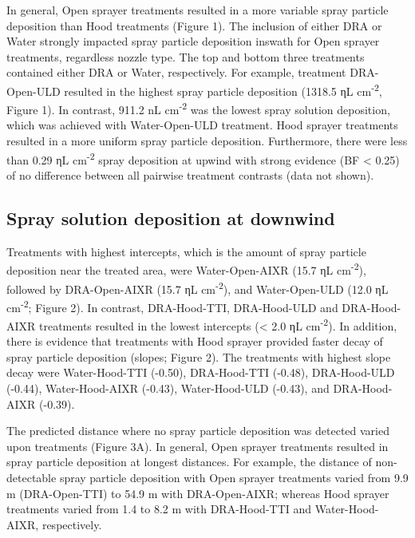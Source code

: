 \documentclass[
  12pt,
  a4paper,
]{article}
\begin{document}
In general, Open sprayer treatments resulted in a more variable spray
particle deposition than Hood treatments (Figure 1). The inclusion of
either DRA or Water strongly impacted spray particle deposition inswath
for Open sprayer treatments, regardless nozzle type. The top and bottom
three treatments contained either DRA or Water, respectively. For
example, treatment DRA-Open-ULD resulted in the highest spray particle
deposition (1318.5 ηL cm\textsuperscript{-2}, Figure 1). In contrast,
911.2 nL cm\textsuperscript{-2} was the lowest spray solution
deposition, which was achieved with Water-Open-ULD treatment. Hood
sprayer treatments resulted in a more uniform spray particle deposition.
Furthermore, there were less than 0.29 ηL cm\textsuperscript{-2} spray
deposition at upwind with strong evidence (BF \textless{} 0.25) of no
difference between all pairwise treatment contrasts (data not shown).

\hypertarget{spray-solution-deposition-at-downwind-1}{%
\subsection{Spray solution deposition at
downwind}\label{spray-solution-deposition-at-downwind-1}}

Treatments with highest intercepts, which is the amount of spray
particle deposition near the treated area, were Water-Open-AIXR (15.7 ηL
cm\textsuperscript{-2}), followed by DRA-Open-AIXR (15.7 ηL
cm\textsuperscript{-2}), and Water-Open-ULD (12.0 ηL
cm\textsuperscript{-2}; Figure 2). In contrast, DRA-Hood-TTI,
DRA-Hood-ULD and DRA-Hood-AIXR treatments resulted in the lowest
intercepts (\textless{} 2.0 ηL cm\textsuperscript{-2}). In addition,
there is evidence that treatments with Hood sprayer provided faster
decay of spray particle deposition (slopes; Figure 2). The treatments
with highest slope decay were Water-Hood-TTI (-0.50), DRA-Hood-TTI
(-0.48), DRA-Hood-ULD (-0.44), Water-Hood-AIXR (-0.43), Water-Hood-ULD
(-0.43), and DRA-Hood-AIXR (-0.39).

The predicted distance where no spray particle deposition was detected
varied upon treatments (Figure 3A). In general, Open sprayer treatments
resulted in spray particle deposition at longest distances. For example,
the distance of non-detectable spray particle deposition with Open
sprayer treatments varied from 9.9 m (DRA-Open-TTI) to 54.9 m with
DRA-Open-AIXR; whereas Hood sprayer treatments varied from 1.4 to 8.2 m
with DRA-Hood-TTI and Water-Hood-AIXR, respectively.
\end{document}
